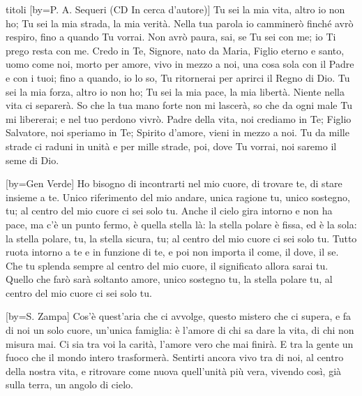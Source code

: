 \begin{songs}{titoli}
[by={P. A. Sequeri (CD In cerca d'autore)}]
\beginverse
Tu sei la mia vita, altro io non ho; Tu sei la mia strada, la mia verità.
Nella tua parola io camminerò
finché avrò respiro, fino a quando Tu vorrai.
Non avrò paura, sai, se Tu sei con me; io Ti prego resta con me.
\endverse
\beginverse
Credo in Te, Signore, nato da Maria, Figlio eterno e santo, uomo come noi,
morto per amore, vivo in mezzo a noi,
una cosa sola con il Padre e con i tuoi;
fino a quando, io lo so, Tu ritornerai per aprirci il Regno di Dio.
\endverse
\beginverse
Tu sei la mia forza, altro io non ho; Tu sei la mia pace, la mia libertà.
Niente nella vita ci separerà.
So che la tua mano forte non mi lascerà,
so che da ogni male Tu mi libererai; e nel tuo perdono vivrò.
\endverse
\beginverse
Padre della vita, noi crediamo in Te; Figlio Salvatore, noi speriamo in Te;
Spirito d'amore, vieni in mezzo a noi.
Tu da mille strade ci raduni in unità
e per mille strade, poi, dove Tu vorrai, noi saremo il seme di Dio.
\endverse
\endsong

[by={Gen Verde}]
\beginverse
Ho bisogno di incontrarti nel mio cuore,
di trovare te, di stare insieme a te.
Unico riferimento del mio andare,
unica ragione tu, unico sostegno, tu;
al centro del mio cuore ci sei solo tu.
\endverse
\beginverse
Anche il cielo gira intorno e non ha pace,
ma c'è un punto fermo, è quella stella là:
la stella polare è fissa, ed è la sola:
la stella polare, tu, la stella sicura, tu;
al centro del mio cuore ci sei solo tu.
Tutto ruota intorno a te e in funzione di te,
e poi non importa il come, il dove, il se.
\endverse
\beginchorus
Che tu splenda sempre al centro del mio cuore,
il significato allora sarai tu.
Quello che farò sarà soltanto amore,
unico sostegno tu, la stella polare tu,
al centro del mio cuore ci sei solo tu.
\endchorus
\endsong

[by={S. Zampa}]
\beginverse
Cos'è quest'aria che ci avvolge, questo mistero che ci supera,
e fa di noi un solo cuore, un'unica famiglia:
è l'amore di chi sa dare la vita, di chi non misura mai.
\endverse
\beginchorus
Ci sia tra voi la carità,
l'amore vero che mai finirà.
E tra la gente un fuoco che
il mondo intero trasformerà.
\endchorus
\beginverse
Sentirti ancora vivo tra di noi, al centro della nostra vita,
e ritrovare come nuova quell'unità più vera,
vivendo così, già sulla terra, un angolo di cielo.
\endverse
\endsong


\end{songs}
